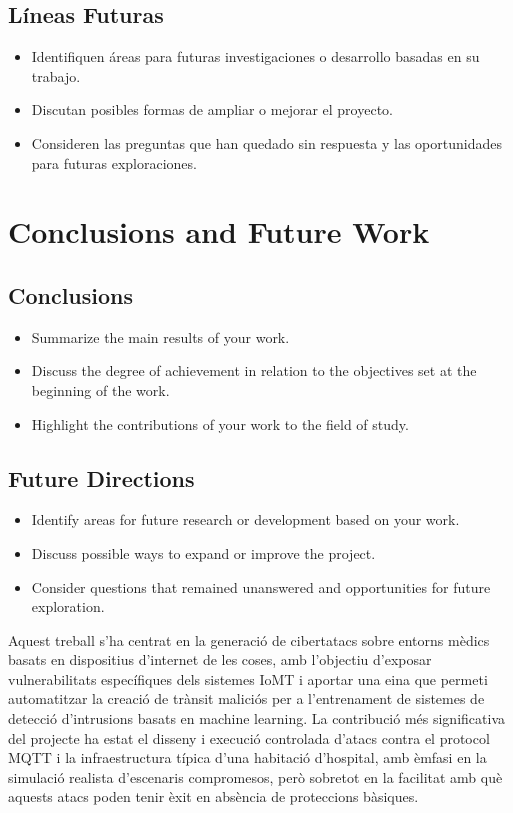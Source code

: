   \section{Líneas Futuras}
    \begin{itemize}
      \item Identifiquen áreas para futuras investigaciones o desarrollo basadas en su trabajo.
      \item Discutan posibles formas de ampliar o mejorar el proyecto.
      \item Consideren las preguntas que han quedado sin respuesta y las oportunidades para futuras exploraciones.
    \end{itemize}

\else
\chapter{Conclusions and Future Work}
  \section{Conclusions}
    \begin{itemize}
      \item Summarize the main results of your work.
      \item Discuss the degree of achievement in relation to the objectives set at the beginning of the work.
      \item Highlight the contributions of your work to the field of study.
    \end{itemize}
  
  \section{Future Directions}
    \begin{itemize}
      \item Identify areas for future research or development based on your work.
      \item Discuss possible ways to expand or improve the project.
      \item Consider questions that remained unanswered and opportunities for future exploration.
    \end{itemize}

\fi

Aquest treball s’ha centrat en la generació de cibertatacs sobre entorns mèdics basats en dispositius d'internet de les coses, amb l’objectiu d’exposar vulnerabilitats específiques dels sistemes IoMT i aportar una eina que permeti automatitzar la creació de trànsit maliciós per a l’entrenament de sistemes de detecció d’intrusions basats en machine learning. La contribució més significativa del projecte ha estat el disseny i execució controlada d’atacs contra el protocol MQTT i la infraestructura típica d'una habitació d'hospital, amb èmfasi en la simulació realista d’escenaris compromesos, però sobretot en la facilitat amb què aquests atacs poden tenir èxit en absència de proteccions bàsiques.

